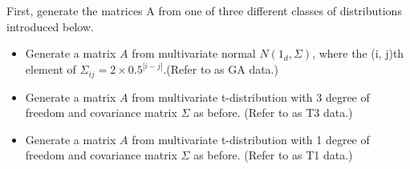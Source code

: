 \begin{enumerate}
    First, generate the matrices A from one of three different classes of distributions introduced below.%
    \begin{itemize}
        \item Generate a matrix $A$ from multivariate normal $N(1_d, \Sigma)$, where the (i, j)th element of $\Sigma_{ij} = 2\times 0.5^{|i-j|}$.(Refer to as GA data.)
        \item Generate a matrix $A$ from multivariate t-distribution with 3 degree of freedom and covariance matrix $\Sigma$ as before. (Refer to as T3 data.)
        \item  Generate a matrix $A$ from multivariate t-distribution with 1 degree of freedom and covariance matrix $\Sigma$ as before. (Refer to as T1 data.)
    \end{itemize}


\end{enumerate}
